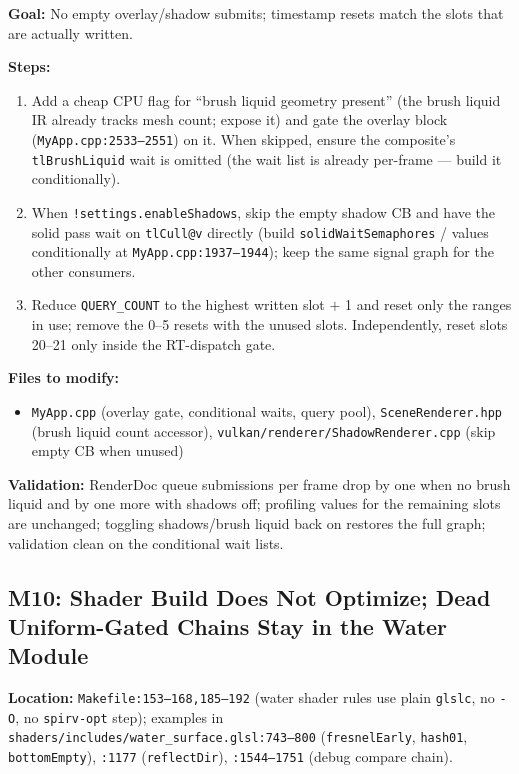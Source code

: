 \documentclass[11pt,a4paper]{article}
\begin{document}
\begin{tcolorbox}[promptbox={Prompt: Gate Auxiliary Water Submits and Prune the Timestamp Slots}]
\textbf{Goal:} No empty overlay/shadow submits; timestamp resets match the slots that are actually written.

\textbf{Steps:}
\begin{enumerate}
    \item Add a cheap CPU flag for ``brush liquid geometry present'' (the brush liquid IR already tracks mesh count; expose it) and gate the overlay block
    (\texttt{MyApp.cpp:2533--2551}) on it. When skipped, ensure the composite's \texttt{tlBrushLiquid} wait is omitted (the wait list is already per-frame --- build it
    conditionally).
    \item When \texttt{!settings.enableShadows}, skip the empty shadow CB and have the solid pass wait on \texttt{tlCull@v} directly (build \texttt{solidWaitSemaphores} /
    values conditionally at \texttt{MyApp.cpp:1937--1944}); keep the same signal graph for the other consumers.
    \item Reduce \texttt{QUERY\_COUNT} to the highest written slot $+$ 1 and reset only the ranges in use; remove the 0--5 resets with the unused slots. Independently, reset
    slots 20--21 only inside the RT-dispatch gate.
\end{enumerate}

\textbf{Files to modify:}
\begin{itemize}
    \item \texttt{MyApp.cpp} (overlay gate, conditional waits, query pool), \texttt{SceneRenderer.hpp} (brush liquid count accessor),
    \texttt{vulkan/renderer/ShadowRenderer.cpp} (skip empty CB when unused)
\end{itemize}

\textbf{Validation:} RenderDoc queue submissions per frame drop by one when no brush liquid and by one more with shadows off; profiling values for the remaining slots are
unchanged; toggling shadows/brush liquid back on restores the full graph; validation clean on the conditional wait lists.
\end{tcolorbox}

\subsection{M10: Shader Build Does Not Optimize; Dead Uniform-Gated Chains Stay in the Water Module}

\textbf{Location:} \texttt{Makefile:153--168,185--192} (water shader rules use plain \texttt{glslc}, no \texttt{-O}, no \texttt{spirv-opt} step); examples in
\texttt{shaders/includes/water\_surface.glsl:743--800} (\texttt{fresnelEarly}, \texttt{hash01}, \texttt{bottomEmpty}), \texttt{:1177} (\texttt{reflectDir}), \texttt{:1544--1751}
(debug compare chain).
\end{document}
